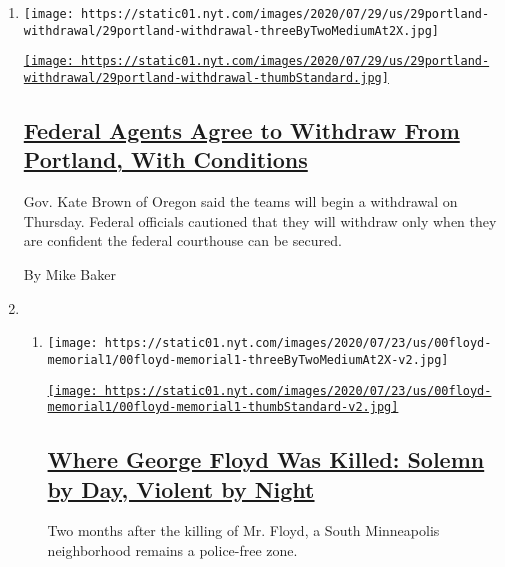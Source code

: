 \begin{enumerate}
\def\labelenumi{\arabic{enumi}.}
\item
  \texttt{[image: https://static01.nyt.com/images/2020/07/29/us/29portland-withdrawal/29portland-withdrawal-threeByTwoMediumAt2X.jpg]}

  \href{/2020/07/29/us/protests-portland-federal-withdrawal.html}{\texttt{[image: https://static01.nyt.com/images/2020/07/29/us/29portland-withdrawal/29portland-withdrawal-thumbStandard.jpg]}}

  \hypertarget{federal-agents-agree-to-withdraw-from-portland-with-conditions}{%
  \subsection{\texorpdfstring{\href{/2020/07/29/us/protests-portland-federal-withdrawal.html}{Federal
  Agents Agree to Withdraw From Portland, With
  Conditions}}{Federal Agents Agree to Withdraw From Portland, With Conditions}}\label{federal-agents-agree-to-withdraw-from-portland-with-conditions}}

  Gov. Kate Brown of Oregon said the teams will begin a withdrawal on
  Thursday. Federal officials cautioned that they will withdraw only
  when they are confident the federal courthouse can be secured.

  By Mike Baker
\item
  \begin{enumerate}
  \def\labelenumii{\arabic{enumii}.}
  \item
    \texttt{[image: https://static01.nyt.com/images/2020/07/23/us/00floyd-memorial1/00floyd-memorial1-threeByTwoMediumAt2X-v2.jpg]}

    \href{/2020/07/29/us/george-floyd-memorial.html}{\texttt{[image: https://static01.nyt.com/images/2020/07/23/us/00floyd-memorial1/00floyd-memorial1-thumbStandard-v2.jpg]}}

    \hypertarget{where-george-floyd-was-killed-solemn-by-day-violent-by-night}{%
    \subsection{\texorpdfstring{\href{/2020/07/29/us/george-floyd-memorial.html}{Where
    George Floyd Was Killed: Solemn by Day, Violent by
    Night}}{Where George Floyd Was Killed: Solemn by Day, Violent by Night}}\label{where-george-floyd-was-killed-solemn-by-day-violent-by-night}}

    Two months after the killing of Mr. Floyd, a South Minneapolis
    neighborhood remains a police-free zone.


\end{enumerate}
\end{enumerate}

